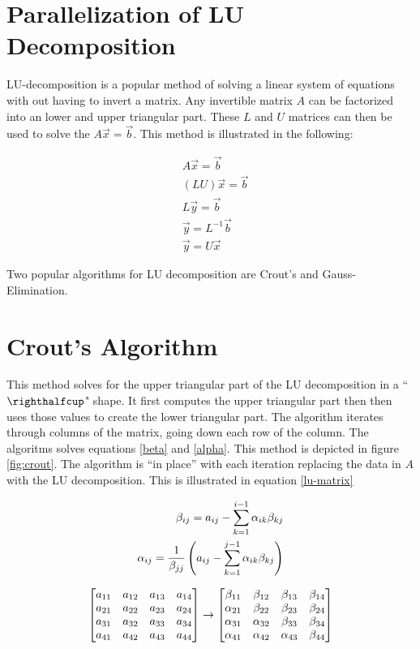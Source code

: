 \documentclass[12pt,letterpaper]{article}
\begin{document}

\section*{Parallelization of LU Decomposition} %

LU-decomposition is a popular method of solving a linear system of equations with out having to invert a matrix. Any invertible matrix \(A\) can be factorized into an lower and upper triangular part. These \(L\) and \(U\) matrices can then be used to solve the \(A\vec{x} = \vec{b} \). This method is illustrated in the following:

\begin{align}
		&A\vec{x} = \vec{b} \\
	&(LU)\vec{x} = \vec{b} \\
	&L\vec{y} = \vec{b} \\
	&\vec{y} = L^{-1}\vec{b} \\
	&\vec{y} = U\vec{x}
\end{align}

Two popular algorithms for LU decomposition are Crout's and Gauss-Elimination.

\section{Crout's Algorithm}
   This method solves for the upper triangular part of the LU decomposition in a ``$\righthalfcup$" shape. It first computes the upper triangular part then then uses those values to create the lower triangular part. The algorithm iterates through columns of the matrix, going down each row of the column. The algoritms solves equations \ref{beta} and \ref{alpha}. This method is depicted in figure \ref{fig:crout}. The algorithm is ``in place'' with each iteration replacing the data in \(A\) with the LU decomposition. This is illustrated in equation \ref{lu-matrix}

\begin{align}
   \beta_{ij} = a_{ij} - \sum_{k=1}^{i-1} \alpha_{ik}\beta_{kj} \label{beta} \\
   \alpha_{ij} = {1 \over \beta_{jj}} \left(a_{ij} - \sum_{k=1}^{j-1} \alpha_{ik}\beta_{kj}\right) \label{alpha}
\end{align}

   \begin{align}\label{lu-matrix}
   	\mqty[\xmat*{a}{4}{4}] \rightarrow  \mqty[\beta_{11} & \beta_{12} & \beta_{13} & \beta_{14} \\
   	\alpha_{21} & \beta_{22} & \beta_{23} & \beta_{24} \\
   	\alpha_{31} & \alpha_{32} & \beta_{33} & \beta_{34} \\
   	\alpha_{41} & \alpha_{42} & \alpha_{43} & \beta_{44} \\]
   \end{align}
\end{document}
